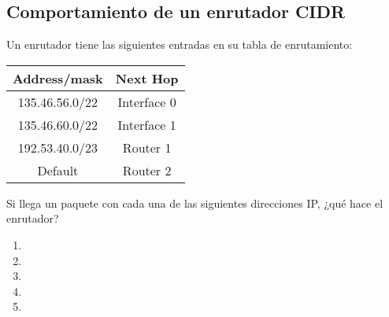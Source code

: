 \documentclass[12pt]{report}
\begin{document}
\begin{exer}
	\subsection{Comportamiento de un enrutador CIDR \sthree}
	Un enrutador tiene las siguientes entradas  en su tabla de enrutamiento:\\

	\begin{center}
		\begin{tabular}{| c | c |}
			\hline
			Address/mask   & Next Hop    \\
			\hline \hline
			135.46.56.0/22 & Interface 0 \\
			\hline
			135.46.60.0/22 & Interface 1 \\
			\hline
			192.53.40.0/23 & Router 1    \\
			\hline
			Default        & Router 2    \\
			\hline
		\end{tabular}
	\end{center}

	Si llega un paquete con cada una de las siguientes direcciones IP, ¿qué hace el enrutador?

	\begin{enumerate}
		\item {}
		\item {}
		\item {}
		\item {}
		\item {}
	\end{enumerate}
\end{exer}
\end{document}
